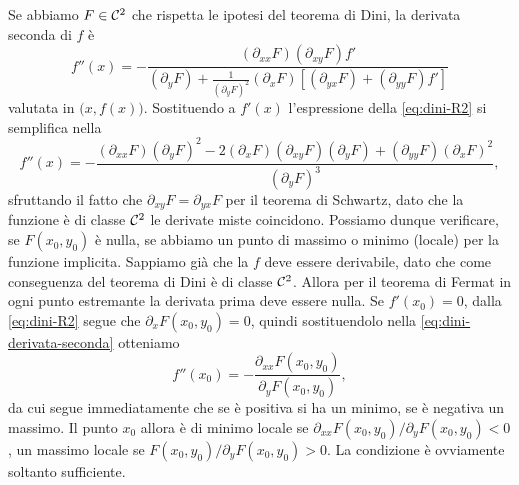Se abbiamo $F\in\mathcal{C}^{{2}}$ che rispetta le ipotesi del teorema di Dini, la derivata seconda di $f$ è
\begin{equation}
	f''(x)=-\frac{(\partial_{xx}F)(\partial_{xy}F)f'}{(\partial_yF)+\frac1{(\partial_yF)^2}(\partial_xF)[(\partial_{yx}F)+(\partial_{yy}F)f']}
\end{equation}
valutata in $\big(x,f(x)\big)$. Sostituendo a $f'(x)$ l'espressione della \eqref{eq:dini-R2} si semplifica nella
\begin{equation} 
	f''(x)=-\frac{(\partial_{xx}F)(\partial_yF)^2-2(\partial_xF)(\partial_{xy}F)(\partial_yF)+(\partial_{yy}F)(\partial_xF)^2}{(\partial_yF)^3},
	\label{eq:dini-derivata-seconda}
\end{equation}
sfruttando il fatto che $\partial_{xy}F=\partial_{yx}F$ per il teorema di Schwartz, dato che la funzione è di classe $\mathcal{C}^{{2}}$ le derivate miste coincidono.
Possiamo dunque verificare, se $F(x_0,y_0)$ è nulla, se abbiamo un punto di massimo o minimo (locale) per la funzione implicita.
Sappiamo già che la $f$ deve essere derivabile, dato che come conseguenza del teorema di Dini è di classe $\mathcal{C}^{{2}}$.
Allora per il teorema di Fermat in ogni punto estremante la derivata prima deve essere nulla.
Se $f'(x_0)=0$, dalla \eqref{eq:dini-R2} segue che $\partial_xF(x_0,y_0)=0$, quindi sostituendolo nella \eqref{eq:dini-derivata-seconda} otteniamo
\begin{equation} 
	f''(x_0)=-\frac{\partial_{xx}F(x_0,y_0)}{\partial_yF(x_0,y_0)},
	\label{eq:derivata-seconda-semplificata-dini}
\end{equation}
da cui segue immediatamente che se è positiva si ha un minimo, se è negativa un massimo.
Il punto $x_0$ allora è di minimo locale se $\partial_{xx}F(x_0,y_0)/\partial_yF(x_0,y_0)<0$, un massimo locale se $F(x_0,y_0)/\partial_yF(x_0,y_0)>0$.
La condizione è ovviamente soltanto sufficiente.

